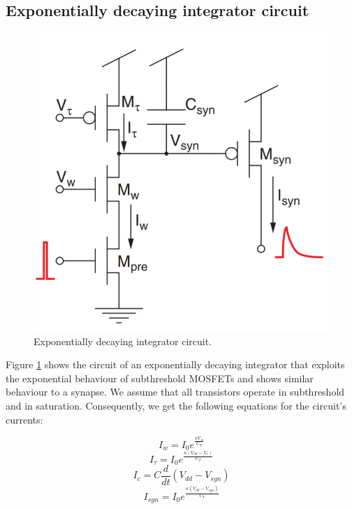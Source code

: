 \subsection{Exponentially decaying integrator circuit}\label{sec:exponentially_decaying_integrator}

\begin{figure}
    \centering
    \includegraphics[width=.6\linewidth]{Figures/exponentially_decaying_integrator.PNG}
    \caption{Exponentially decaying integrator circuit.}
    \label{fig:exponentially_decaying_integrator}
\end{figure}

Figure \ref{fig:exponentially_decaying_integrator} shows the circuit of an exponentially decaying integrator that exploits the exponential behaviour of subthreshold MOSFETs and shows similar behaviour to a synapse. We assume that all transistors operate in subthreshold and in saturation. Consequently, we get the following equations for the circuit's currents:

\begin{equation}
    I_w = I_0 e^{\frac{\kappa V_w}{U_T}}
\end{equation}
\begin{equation}
    I_{\tau} = I_0 e^{\frac{\kappa (V_{dd}-V_{\tau})}{U_T}}
\end{equation}
\begin{equation}
    I_c = C \frac{d}{dt} (V_{dd}-V_{syn})
\end{equation}
\begin{equation}
    I_{syn} = I_0 e^{\frac{\kappa (V_{dd}-V_{syn})}{U_T}}
\end{equation}

